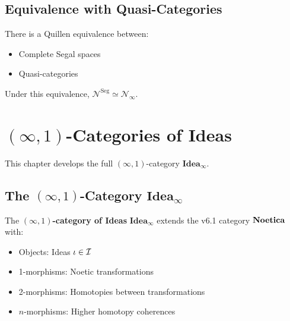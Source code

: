 \section{Equivalence with Quasi-Categories}

\begin{theorem}
\label{thm:segal-qcat-equiv}
There is a Quillen equivalence between:
\begin{itemize}
  \item Complete Segal spaces
  \item Quasi-categories
\end{itemize}
Under this equivalence, $\mathcal{N}^{\mathrm{Seg}} \simeq \mathcal{N}_\infty$.
\end{theorem}


\chapter{$(\infty,1)$-Categories of Ideas}
\label{ch:infty-ideas}

\begin{tcolorbox}[colback=blue!5!white,colframe=blue!75!black,title=\vnewfour]
This chapter develops the full $(\infty,1)$-category $\mathbf{Idea}_\infty$.
\end{tcolorbox}

\section{The $(\infty,1)$-Category $\mathbf{Idea}_\infty$}

\begin{definition}
\label{def:idea-infty}
The \textbf{$(\infty,1)$-category of Ideas} $\mathbf{Idea}_\infty$ extends the
v6.1 category $\mathbf{Noetica}$ with:
\begin{itemize}
  \item Objects: Ideas $\iota \in \mathcal{I}$
  \item 1-morphisms: Noetic transformations
  \item 2-morphisms: Homotopies between transformations
  \item $n$-morphisms: Higher homotopy coherences
\end{itemize}
\end{definition}

